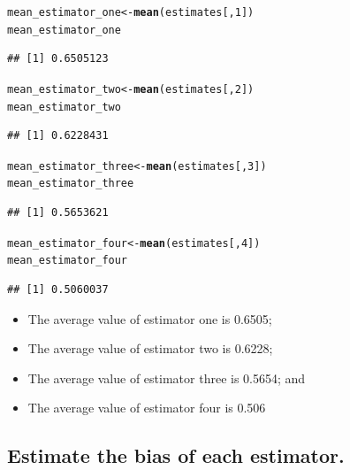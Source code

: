 \documentclass{article}\usepackage[]{graphicx}\usepackage[]{xcolor}
\makeatletter
\newcommand{\hlnum}[1]{\textcolor[rgb]{0.686,0.059,0.569}{#1}}%
\newcommand{\hlstd}[1]{\textcolor[rgb]{0.345,0.345,0.345}{#1}}%
\newcommand{\hlkwb}[1]{\textcolor[rgb]{0.69,0.353,0.396}{#1}}%
\newcommand{\hlkwd}[1]{\textcolor[rgb]{0.737,0.353,0.396}{\textbf{#1}}}%
\newenvironment{kframe}{%
 \def\at@end@of@kframe{}%
 \ifinner\ifhmode%
  \def\at@end@of@kframe{\end{minipage}}%
  \begin{minipage}{\columnwidth}%
 \fi\fi%
 \def\FrameCommand##1{\hskip\@totalleftmargin \hskip-\fboxsep
 \colorbox{shadecolor}{##1}\hskip-\fboxsep
     \hskip-\linewidth \hskip-\@totalleftmargin \hskip\columnwidth}%
 \MakeFramed {\advance\hsize-\width
   \@totalleftmargin\z@ \linewidth\hsize
   \@setminipage}}%
 {\par\unskip\endMakeFramed%
 \at@end@of@kframe}
\newenvironment{knitrout}{}{} %
\makeatother
\begin{document}
\begin{knitrout}
\color{fgcolor}\begin{kframe}
\begin{alltt}
\hlstd{mean_estimator_one} \hlkwb{<-} \hlkwd{mean}\hlstd{(estimates[,}\hlnum{1}\hlstd{])}
\hlstd{mean_estimator_one}
\end{alltt}
\begin{verbatim}
## [1] 0.6505123
\end{verbatim}
\begin{alltt}
\hlstd{mean_estimator_two} \hlkwb{<-} \hlkwd{mean}\hlstd{(estimates[,}\hlnum{2}\hlstd{])}
\hlstd{mean_estimator_two}
\end{alltt}
\begin{verbatim}
## [1] 0.6228431
\end{verbatim}
\begin{alltt}
\hlstd{mean_estimator_three} \hlkwb{<-} \hlkwd{mean}\hlstd{(estimates[,}\hlnum{3}\hlstd{])}
\hlstd{mean_estimator_three}
\end{alltt}
\begin{verbatim}
## [1] 0.5653621
\end{verbatim}
\begin{alltt}
\hlstd{mean_estimator_four} \hlkwb{<-} \hlkwd{mean}\hlstd{(estimates[,}\hlnum{4}\hlstd{])}
\hlstd{mean_estimator_four}
\end{alltt}
\begin{verbatim}
## [1] 0.5060037
\end{verbatim}
\end{kframe}
\end{knitrout}


\begin{itemize}
  \item The average value of estimator one is 0.6505;
  \item The average value of estimator two is 0.6228;
  \item The average value of estimator three is 0.5654; and
  \item The average value of estimator four is 0.506
\end{itemize}

  \subsection{Estimate the bias of each estimator.}
  
\end{document}

